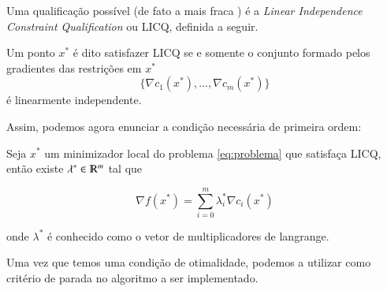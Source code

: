 Uma qualificação possível (de fato a mais fraca \citep{Wachsmuth201378}) é a
\emph{Linear Independence Constraint Qualification} ou LICQ, definida a seguir.

\begin{definition}
    Um ponto $x^*$ é dito satisfazer LICQ se e somente o conjunto formado pelos
    gradientes das restrições em $x^*$
    $$ \{ \nabla c_1(x^*), \dots, \nabla c_m(x^*)\} $$
    é linearmente independente.
\end{definition}

Assim, podemos agora enunciar a condição necessária de primeira ordem:

\begin{theorem}
    Seja $x^*$ um minimizador local do problema \ref{eq:problema} que satisfaça LICQ,
    então existe $\lambda^* \in \varmathbb{R}^m$ tal que

    \begin{equation}
        \nabla f(x^*) = \sum_{i = 0}^{m} \lambda_i^* \nabla c_i(x^*)
    \end{equation}

    onde $\lambda^*$ é conhecido como o vetor de multiplicadores de langrange.
\end{theorem}

Uma vez que temos uma condição de otimalidade, podemos a utilizar como critério
de parada no algoritmo a ser implementado.
